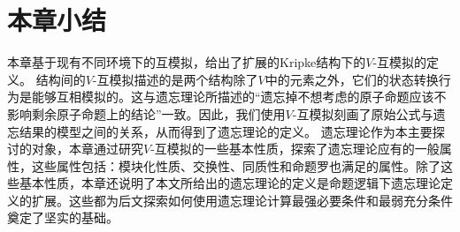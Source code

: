 %
%



\section{本章小结} 
本章基于现有不同环境下的互模拟，给出了扩展的Kripke结构下的$V$-互模拟的定义。
结构间的$V$-互模拟描述的是两个结构除了$V$中的元素之外，它们的状态转换行为是能够互相模拟的。这与遗忘理论所描述的“遗忘掉不想考虑的原子命题应该不影响剩余原子命题上的结论”一致。因此，我们使用$V$-互模拟刻画了原始公式与遗忘结果的模型之间的关系，从而得到了遗忘理论的定义。
遗忘理论作为本主要探讨的对象，本章通过研究$V$-互模拟的一些基本性质，探索了遗忘理论应有的一般属性，这些属性包括：模块化性质、交换性、同质性和命题罗也满足的属性。除了这些基本性质，本章还说明了本文所给出的遗忘理论的定义是命题逻辑下遗忘理论定义的扩展。这些都为后文探索如何使用遗忘理论计算最强必要条件和最弱充分条件奠定了坚实的基础。

